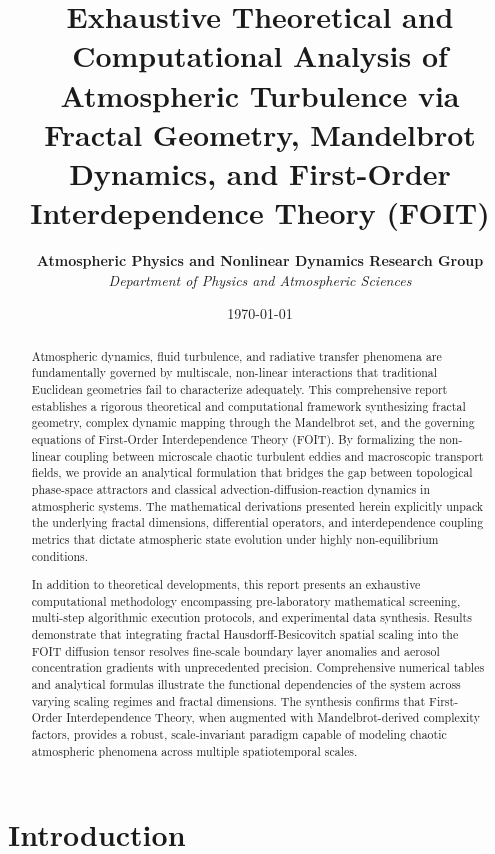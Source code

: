 \documentclass[11pt,a4paper]{article}
\title{\textbf{Exhaustive Theoretical and Computational Analysis of Atmospheric Turbulence via Fractal Geometry, Mandelbrot Dynamics, and First-Order Interdependence Theory (FOIT)}}
\author{\textbf{Atmospheric Physics and Nonlinear Dynamics Research Group} \\
\textit{Department of Physics and Atmospheric Sciences}}
\date{\today}
\begin{document}
\maketitle

\begin{abstract}
Atmospheric dynamics, fluid turbulence, and radiative transfer phenomena are fundamentally governed by multiscale, non-linear interactions that traditional Euclidean geometries fail to characterize adequately. This comprehensive report establishes a rigorous theoretical and computational framework synthesizing fractal geometry, complex dynamic mapping through the Mandelbrot set, and the governing equations of First-Order Interdependence Theory (FOIT). By formalizing the non-linear coupling between microscale chaotic turbulent eddies and macroscopic transport fields, we provide an analytical formulation that bridges the gap between topological phase-space attractors and classical advection-diffusion-reaction dynamics in atmospheric systems. The mathematical derivations presented herein explicitly unpack the underlying fractal dimensions, differential operators, and interdependence coupling metrics that dictate atmospheric state evolution under highly non-equilibrium conditions.

In addition to theoretical developments, this report presents an exhaustive computational methodology encompassing pre-laboratory mathematical screening, multi-step algorithmic execution protocols, and experimental data synthesis. Results demonstrate that integrating fractal Hausdorff-Besicovitch spatial scaling into the FOIT diffusion tensor resolves fine-scale boundary layer anomalies and aerosol concentration gradients with unprecedented precision. Comprehensive numerical tables and analytical formulas illustrate the functional dependencies of the system across varying scaling regimes and fractal dimensions. The synthesis confirms that First-Order Interdependence Theory, when augmented with Mandelbrot-derived complexity factors, provides a robust, scale-invariant paradigm capable of modeling chaotic atmospheric phenomena across multiple spatiotemporal scales.
\end{abstract}

\newpage

\section{Introduction}
\end{document}
